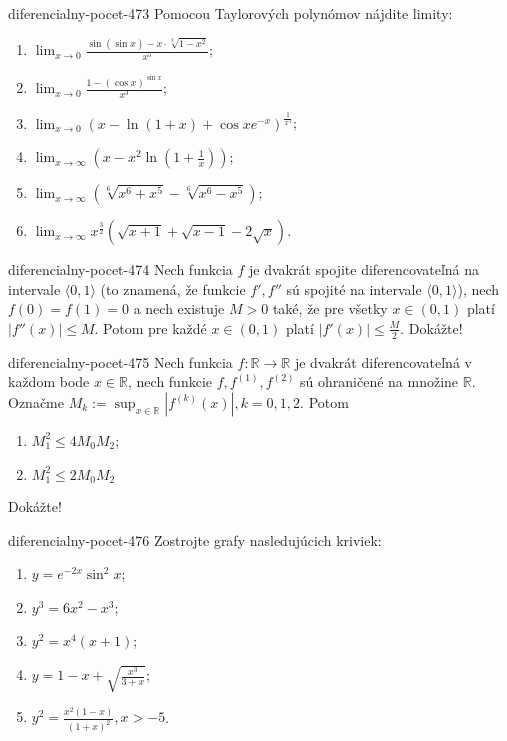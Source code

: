 \begin{defproblem}{diferencialny-pocet-473}
Pomocou Taylorových polynómov nájdite limity:
\begin{multicols}{2}
\begin{enumerate}
	\item $\lim_{x\rightarrow 0}\frac{\sin (\sin x)-x\cdot\sqrt[3]{1-x^2}}{x^5}$;
	\item $\lim_{x\rightarrow 0}\frac{1-(\cos x)^{\sin x}}{x^3}$;
	\item $\lim_{x\rightarrow 0}(x-\ln (1+x)+\cos xe^{-x})^{\frac{1}{x^3}}$;
	\item $\lim_{x\rightarrow \infty}(x-x^2\ln (1+\frac{1}{x}))$;
	\item $\lim_{x\rightarrow \infty}(\sqrt[6]{x^6+x^5}-\sqrt[6]{x^6-x^5})$;
	\item $\lim_{x\rightarrow \infty}x^{\frac{3}{2}}(\sqrt{x+1}+\sqrt{x-1}-2\sqrt{x})$.
\end{enumerate}
\end{multicols}
\end{defproblem}

\begin{defproblem}{diferencialny-pocet-474}
Nech funkcia $f$ je dvakrát spojite diferencovateľná na intervale $\langle 0,1 \rangle$ (to znamená, že funkcie $f',f''$ sú spojité na intervale $\langle 0,1 \rangle$), nech $f(0)=f(1)=0$ a nech existuje $M>0$ také, že pre všetky $x\in (0,1)$ platí $|f''(x)|\leq M$. Potom pre každé $x\in (0,1)$ platí $|f'(x)|\leq \frac{M}{2}$. Dokážte!
\end{defproblem}

\begin{defproblem}{diferencialny-pocet-475}
Nech funkcia $f:\mathbb{R}\rightarrow\mathbb{R}$ je dvakrát diferencovateľná v každom bode $x\in\mathbb{R}$, nech funkcie $f,f^{(1)},f^{(2)}$ sú ohraničené na množine $\mathbb{R}$. Označme $M_k:=\sup_{x\in\mathbb{R}}|f^{(k)}(x)|,k=0,1,2$. Potom
\begin{enumerate}
\item $M^2_1\leq 4M_0M_2$;
\item $M^2_1\leq 2M_0M_2$
\end{enumerate}
Dokážte!
\end{defproblem}

\begin{defproblem}{diferencialny-pocet-476}
Zostrojte grafy nasledujúcich kriviek:
\begin{multicols}{2}
\begin{enumerate}
	\item $y=e^{-2x}\sin^2 x$;
	\item $y^3=6x^2-x^3$;
	\item $y^2=x^4(x+1)$;
	\item $y=1-x+\sqrt{\frac{x^3}{3+x}}$;
	\item $y^2=\frac{x^2(1-x)}{(1+x)^2},x>-5$.
\end{enumerate}
\end{multicols}
\end{defproblem}

